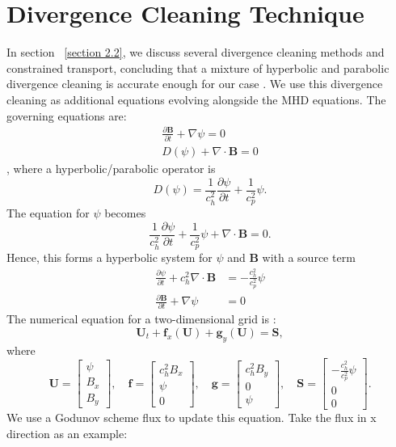 \section{Divergence Cleaning Technique}
In section ~\ref{section 2.2}, we discuss several divergence cleaning methods and constrained transport, concluding that a mixture of hyperbolic and parabolic divergence cleaning is accurate enough for our case \cite{vides2013divergence}. We use this divergence cleaning as additional equations evolving alongside the MHD equations. The governing equations are:
\begin{align*}
\frac{\partial \mathbf{B}}{\partial t} +  \nabla \psi = 0 \\
D(\psi) + \nabla \cdot \mathbf{B} = 0
\end{align*}, where a hyperbolic/parabolic operator is 
\begin{equation*}
D(\psi) = \frac{1}{c_h^2} \frac{\partial \psi}{\partial t} + \frac{1}{c_p^2} \psi.
\end{equation*}
The equation for $\psi$ becomes 
\begin{equation*}
\frac{1}{c_h^2} \frac{\partial \psi}{\partial t} + \frac{1}{c_p^2} \psi+ \nabla \cdot \mathbf{B} = 0 .
\end{equation*}
Hence, this forms a hyperbolic system for $\psi$ and $\mathbf{B}$ with a source term
\begin{align*}
\frac{\partial \psi}{\partial t}+c_h^2\nabla \cdot \mathbf{B}&=-\frac{c_h^2}{c_p^2}\psi\\
\frac{\partial \mathbf{B}}{\partial t} +  \nabla \psi &= 0
\end{align*}
The numerical equation for a two-dimensional grid is :
\begin{equation}
    {{\mathbf{U}}_{t}}+\mathbf{f}_x{{(\mathbf{U})}}+\mathbf{g}_y{{(\mathbf{U})}}=\mathbf{S},
\end{equation}
where 
\[
\mathbf{U} = \begin{bmatrix}
\psi \\
B_x \\
B_y
\end{bmatrix}, \quad
\mathbf{f} = \begin{bmatrix}
c_h^2B_x \\
\psi \\
0
\end{bmatrix}, \quad
\mathbf{g} = \begin{bmatrix}
c_h^2B_y \\
0 \\
\psi
\end{bmatrix}, \quad
\mathbf{S}=\begin{bmatrix}
-\frac{c_h^2}{c_p^2} \psi \\
0 \\
0
\end{bmatrix}
.\] We use a Godunov scheme flux to update this equation. Take the flux in x direction as an example:
